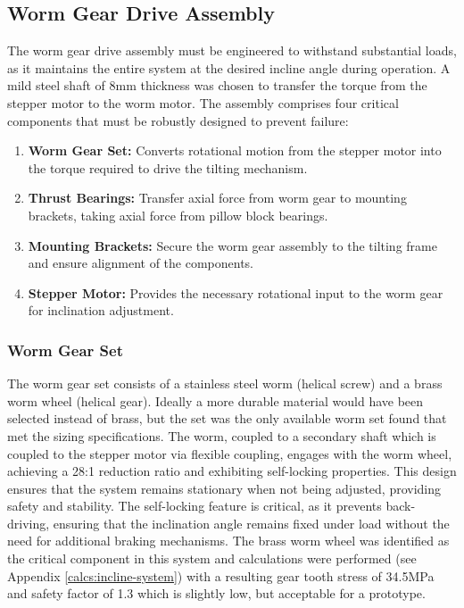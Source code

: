 \subsection{Worm Gear Drive Assembly}
The worm gear drive assembly must be engineered to withstand substantial loads, as it maintains the entire system at the desired incline angle during operation. A mild steel shaft of 8mm thickness was chosen to transfer the torque from the stepper motor to the worm motor. The assembly comprises four critical components that must be robustly designed to prevent failure:

\begin{enumerate}
    \item \textbf{Worm Gear Set:} Converts rotational motion from the stepper motor into the torque required to drive the tilting mechanism.
    \item \textbf{Thrust Bearings:} Transfer axial force from worm gear to mounting brackets, taking axial force from pillow block bearings.
    \item \textbf{Mounting Brackets:} Secure the worm gear assembly to the tilting frame and ensure alignment of the components.
    \item \textbf{Stepper Motor:} Provides the necessary rotational input to the worm gear for inclination adjustment.
\end{enumerate}

\subsubsection{Worm Gear Set}

The worm gear set consists of a stainless steel worm (helical screw) and a brass worm wheel (helical gear). Ideally a more durable material would have been selected instead of brass, but the set was the only available worm set found that met the sizing specifications. The worm, coupled to a secondary shaft which is coupled to the stepper motor via flexible coupling, engages with the worm wheel, achieving a 28:1 reduction ratio and exhibiting self-locking properties. This design ensures that the system remains stationary when not being adjusted, providing safety and stability. The self-locking feature is critical, as it prevents back-driving, ensuring that the inclination angle remains fixed under load without the need for additional braking mechanisms. The brass worm wheel was identified as the critical component in this system and calculations were performed (see Appendix \ref{calcs:incline-system}) with a resulting gear tooth stress of 34.5MPa and safety factor of 1.3 which is slightly low, but acceptable for a prototype.

